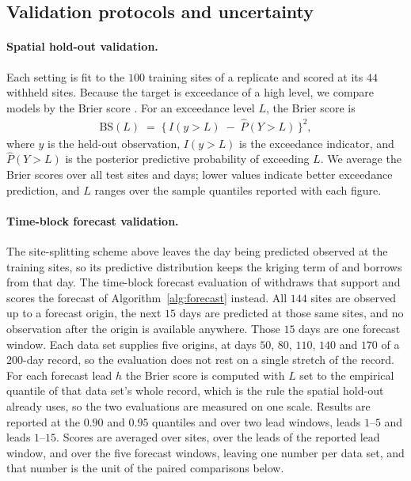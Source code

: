 \documentclass[12pt]{article}
\begin{document}
\subsection{Validation protocols and uncertainty}\label{sec:sim-scoring}

\paragraph{Spatial hold-out validation.}
Each setting is fit to the $100$ training sites of a replicate and scored at its $44$ withheld sites.  Because the target is exceedance of a high level, we compare models by the Brier score \parencite{gneiting_strictly_2007}.  For an exceedance level $L$, the Brier score is
\begin{align}
  \mathrm{BS}(L) \;=\; \big\{\, I(y > L) \;-\; \widehat{P}(Y > L) \,\big\}^2,
  \label{eq:brier-score}
\end{align}
where $y$ is the held-out observation, $I(y > L)$ is the exceedance indicator, and $\widehat{P}(Y > L)$ is the posterior predictive probability of exceeding $L$.  We average the Brier scores over all test sites and days; lower values indicate better exceedance prediction, and $L$ ranges over the sample quantiles reported with each figure.

\paragraph{Time-block forecast validation.}\label{sec:sim-timeblock-cv}

The site-splitting scheme above leaves the day being predicted observed at the training sites, so its predictive distribution keeps the kriging term of  and borrows from that day.  The time-block forecast evaluation of  withdraws that support and scores the forecast of Algorithm~\ref{alg:forecast} instead.  All $144$ sites are observed up to a forecast origin, the next $15$ days are predicted at those same sites, and no observation after the origin is available anywhere.  Those $15$ days are one forecast window.  Each data set supplies five origins, at days $50$, $80$, $110$, $140$ and $170$ of a $200$-day record, so the evaluation does not rest on a single stretch of the record.  For each forecast lead $h$ the Brier score  is computed with $L$ set to the empirical quantile of that data set's whole record, which is the rule the spatial hold-out already uses, so the two evaluations are measured on one scale.  Results are reported at the $0.90$ and $0.95$ quantiles and over two lead windows, leads $1$--$5$ and leads $1$--$15$.  Scores are averaged over sites, over the leads of the reported lead window, and over the five forecast windows, leaving one number per data set, and that number is the unit of the paired comparisons below.
\end{document}
